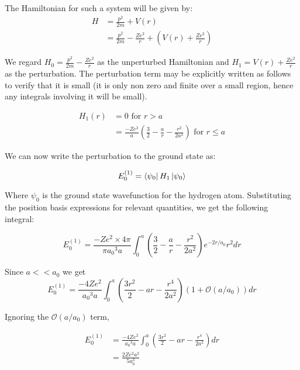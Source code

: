 The Hamiltonian for such a system will be given by:
\begin{equation}
\begin{split}
    H &= \frac{p^2}{2m} + V(r)\\
    &= \frac{p^2}{2m} - \frac{Ze^2}{r} + \left( V(r) +  \frac{Ze^2}{r} \right)
\end{split}
\end{equation}

We regard $H_0 =  \frac{p^2}{2m} - \frac{Ze^2}{r} $ as the unperturbed Hamiltonian and $H_1 =  V(r) +  \frac{Ze^2}{r}$ as the perturbation. The perturbation term may be explicitly written as follows to verify that it is small (it is only non zero and finite over a small region, hence any integrals involving it will be small).

\begin{equation}
    \begin{split}
        H_1(r) &= 0 \text{ for } r>a\\
        &= \frac{-Ze^2}{a} \left( \frac{3}{2} - \frac{a}{r} - \frac{r^2}{2a^2} \right) \text{ for } r \leq a
    \end{split}
\end{equation}

We can now write the perturbation to the ground state as:

\begin{equation}
    E^{(1)}_0 = \bra{\psi_0} H_1 \ket{\psi_0}
\end{equation}

Where $\psi_0$ is the ground state wavefunction for the hydrogen atom. Substituting the position basis expressions for relevant quantities, we get the following integral:

\begin{equation}
    E^{(1)}_0 = \frac{-Ze^2 \times 4 \pi}{\pi {a_0}^3 a} \int_0^a \left( \frac{3}{2} - \frac{a}{r} - \frac{r^2}{2a^2} \right) e^{-2r/a_0} r^2 dr
\end{equation}

Since $a<<a_0$ we get
\begin{equation}
     E^{(1)}_0 = \frac{-4Ze^2}{ {a_0}^3 a} \int_0^a \left( \frac{3r^2}{2} - ar - \frac{r^4}{2a^2} \right) (1 + \mathcal{O}(a/a_0)) dr
\end{equation}

Ignoring the $\mathcal{O}(a/a_0)$ term, 

\begin{equation}
\begin{split}
     E^{(1)}_0 &= \frac{-4Ze^2}{ {a_0}^3 a} \int_0^a \left( \frac{3r^2}{2} - ar - \frac{r^4}{2a^2} \right) dr \\
     &=  \frac{2 Ze^2 a^2}{5  a_0^3}
\end{split}
\end{equation}
